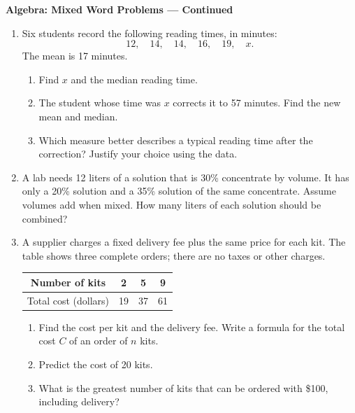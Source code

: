 \documentclass[12pt]{article}
\begin{document}
\newpage
\begin{center}
  {\large\textbf{Algebra: Mixed Word Problems --- Continued}}
\end{center}

\begin{enumerate}[leftmargin=*,itemsep=0pt,resume]
  \item Six students record the following reading times, in minutes:
  \[
    12,\quad 14,\quad 14,\quad 16,\quad 19,\quad x.
  \]
  The mean is 17 minutes.
  \begin{enumerate}[label=(\alph*),leftmargin=1.6em,itemsep=0.2em]
    \item Find $x$ and the median reading time.
    \item The student whose time was $x$ corrects it to 57 minutes. Find
    the new mean and median.
    \item Which measure better describes a typical reading time after
    the correction? Justify your choice using the data.
  \end{enumerate}

  \item A lab needs 12 liters of a solution that is 30\% concentrate by
  volume. It has only a 20\% solution and a 35\% solution of the same
  concentrate. Assume volumes add when mixed. How many liters of each
  solution should be combined?

  \item A supplier charges a fixed delivery fee plus the same price for
  each kit. The table shows three complete orders; there are no taxes or
  other charges.
  \begin{center}
    \begin{tabular}{c|ccc}
      Number of kits & 2 & 5 & 9 \\
      \hline
      Total cost (dollars) & 19 & 37 & 61
    \end{tabular}
  \end{center}
  \begin{enumerate}[label=(\alph*),leftmargin=1.6em,itemsep=0.2em]
    \item Find the cost per kit and the delivery fee. Write a formula for
    the total cost $C$ of an order of $n$ kits.
    \item Predict the cost of 20 kits.
    \item What is the greatest number of kits that can be ordered with
    \$100, including delivery?
  \end{enumerate}
\end{enumerate}
\end{document}

